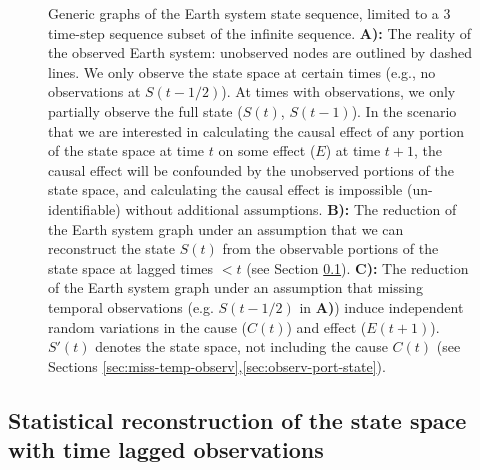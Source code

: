 \documentclass[12pt]{article}
\begin{document}
\begin{figure} 
  \caption{Generic graphs of the Earth system state sequence, limited
    to a 3 time-step sequence subset of the infinite
    sequence. \textbf{A):} The reality of the observed Earth system:
    unobserved nodes are outlined by dashed lines. We only observe the
    state space at certain times (e.g., no observations at $S(t-1/2)$). At
    times with observations, we only partially observe the full state
    ($S(t)$, $S(t-1)$). In the scenario that we are interested in
    calculating the causal effect of any portion of the state space at
    time $t$ on some effect ($E$) at time $t+1$, the causal effect will be
    confounded by the unobserved portions of the state space, and
    calculating the causal effect is impossible (un-identifiable) without
    additional assumptions. \textbf{B):} The reduction of the Earth system
    graph under an assumption that we can reconstruct the state $S(t)$
    from the observable portions of the state space at lagged times $< t$
    (see Section \ref{sec:stat-reconstr-state}). \textbf{C):} The
    reduction of the Earth system graph under an assumption that missing
    temporal observations (e.g. $S(t-1/2)$ in \textbf{A)}) induce
    independent random variations in the cause ($C(t)$) and effect
    ($E(t+1)$). $S'(t)$ denotes the state space, not including the cause
    $C(t)$ (see Sections
    \ref{sec:miss-temp-observ},\ref{sec:observ-port-state}).}
  \label{fig:generic}
\end{figure}

\subsection{Statistical reconstruction of the state space with time
  lagged observations}
\label{sec:stat-reconstr-state}
\end{document}
